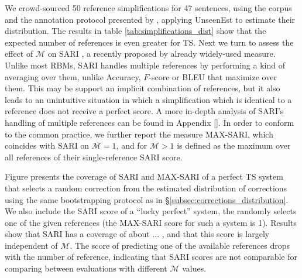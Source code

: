 \documentclass[letterpaper, 11pt]{article}
\newcommand{\lc}[1]{}
\newcommand{\oa}[1]{}
\begin{document}
We crowd-sourced 50 reference simplifications for 47 sentences, using the corpus and the annotation protocol presented by ,\oa{I had to omit the other details for space.} applying {\sc UnseenEst} to estimate their distribution.
The results in table \ref{tab:simplifications_dist} show that the expected number of references is even greater for TS. 
Next we turn to assess the effect of $\mathcal{M}$ on SARI \cite{Xu-EtAl:2016:TACL}, a recently proposed by already widely-used measure. Unlike most RBMs, SARI handles multiple references by performing a kind of averaging over them, unlike Accuracy, $F$-score or BLEU \cite{} that maximize over them. This may be support an implicit combination of references, but it also leads to an unintuitive situation in which a simplification which is identical to a reference does not receive a perfect score. A more in-depth analysis of SARI's handling of multiple references can be found in Appendix \ref{}.\oa{I commented stuff out, we can have this analysis in an appendix}
In order to conform to the common practice, we further report the measure MAX-SARI, which coincides with SARI on $\mathcal{M}=1$, and for $\mathcal{M}>1$ is defined as the maximum over all references of their single-reference SARI score.


Figure \lc{add here} presents the coverage of SARI and MAX-SARI of a perfect TS system that selects a random correction
from the estimated distribution of corrections using the same bootstrapping protocol as in \S\ref{subsec:corrections_distribution}.
We also include the SARI score of a ``lucky perfect'' system, the randomly selects one of the given references (the MAX-SARI score for such a system is 1). Results show that SARI has a coverage of about ... \oa{add}, and that this score is largely independent of $\mathcal{M}$.
The score of predicting one of the available references drops with the number of reference, indicating that SARI scores are not comparable
for comparing between evaluations with different $\mathcal{M}$ values. 
\end{document}
